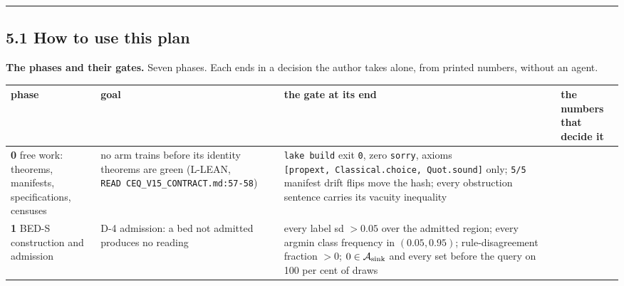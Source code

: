 \documentclass[11pt,a4paper]{article}
\newcounter{none}                 %
\theoremstyle{plain}
\theoremstyle{definition}
\theoremstyle{remark}
\begin{document}
\begin{center}\rule{0.5\linewidth}{0.5pt}\end{center}

\subsection{5.1 How to use this plan}\label{how-to-use-this-plan}

\textbf{The phases and their gates.} Seven phases. Each ends in a
decision the author takes alone, from printed numbers, without an agent.

{\def\LTcaptype{none} %
\begin{longtable}[]{@{}
  >{\raggedright\arraybackslash}p{}
  >{\raggedright\arraybackslash}p{}
  >{\raggedright\arraybackslash}p{}
  >{\raggedright\arraybackslash}p{}@{}}
\toprule\noalign{}
\begin{minipage}[b]{\linewidth}\raggedright
phase
\end{minipage} & \begin{minipage}[b]{\linewidth}\raggedright
goal
\end{minipage} & \begin{minipage}[b]{\linewidth}\raggedright
the gate at its end
\end{minipage} & \begin{minipage}[b]{\linewidth}\raggedright
the numbers that decide it
\end{minipage} \\
\midrule\noalign{}
\endhead
\bottomrule\noalign{}
\endlastfoot
\textbf{0} free work: theorems, manifests, specifications, censuses & no
arm trains before its identity theorems are green (L-LEAN,
\texttt{READ\ CEQ\_V15\_CONTRACT.md:57-58}) & \texttt{lake\ build} exit
\texttt{0}, zero \texttt{sorry}, axioms
\texttt{{[}propext,\ Classical.choice,\ Quot.sound{]}} only;
\texttt{5/5} manifest drift flips move the hash; every obstruction
sentence carries its vacuity inequality & \\
\textbf{1} BED-S construction and admission & D-4 admission: a bed not
admitted produces no reading & every label sd \(>0.05\) over the
admitted region; every argmin class frequency in \((0.05,0.95)\);
rule-disagreement fraction \(>0\); \(0\in\mathcal{A}_{\rm sink}\) and
every set before the query on 100 per cent of draws & \\

\end{longtable}}
\end{document}

